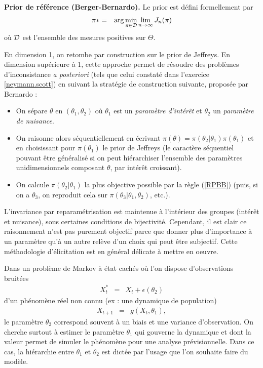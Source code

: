 \begin{definition}{\bf Prior de référence (Berger-Bernardo).}
Le prior est défini formellement par 
\begin{eqnarray}
\pi * & = & \arg\min\limits_{\pi\in{\cal{D}}} \lim\limits_{n\to \infty}J_n(\pi)\label{RPBB}
\end{eqnarray}
où ${\cal{D}}$ est l'ensemble des mesures positives sur $\Theta$. 
\end{definition}

En dimension 1, on retombe par construction sur le prior de Jeffreys. En dimension supérieure à 1, cette approche permet de résoudre des problèmes d'inconsistance {\it a posteriori} (tels que celui constaté dans l'exercice \ref{neymann.scott}) en suivant la stratégie de construction suivante, proposée par Bernardo :
\begin{itemize}
    \item On sépare $\theta$ en $(\theta_1,\theta_2)$ où $\theta_1$ est un \emph{paramètre d'intérêt} et $\theta_2$ un \emph{paramètre de nuisance}.
    \item On raisonne alors séquentiellement en écrivant $\pi(\theta)=\pi(\theta_2|\theta_1)\pi(\theta_1)$ et en choisissant pour $\pi(\theta_1)$ le prior de Jeffreys (le caractère séquentiel pouvant être généralisé si on peut hiérarchiser l'ensemble des paramètres unidimensionnels composant $\theta$, par intérêt croissant).
    \item On calcule $\pi(\theta_2|\theta_1)$ la plus objective possible par la règle (\ref{RPBB}) (puis, si on a $\theta_3$, on reproduit cela sur $\pi(\theta_3|\theta_1,\theta_2)$, etc.).
\end{itemize}
L'invariance par reparamétrisation est maintenue à l'intérieur des groupes (intér\^et et nuisance), sous certaines conditions de bijectivité. Cependant, il est clair ce raisonnement n’est pas purement objectif parce que donner plus d’importance à un paramètre qu’à un autre relève d’un choix qui peut être subjectif. Cette méthodologie d'élicitation est en général délicate à mettre en oeuvre. \\

\begin{exo}
Dans un problème de Markov à état cachés où l'on dispose d'observations bruitées
\begin{eqnarray*}
X^*_t & = & X_t + \epsilon(\theta_2) 
\end{eqnarray*}
d'un phénomène réel non connu (ex : une dynamique de population)
\begin{eqnarray*}
X_{t+1} & = & g(X_t,\theta_1),
\end{eqnarray*}
le paramètre  $\theta_2$ correspond souvent à un biais et une variance d'observation. On cherche surtout à estimer le paramètre $\theta_1$ qui gouverne la dynamique et dont la valeur permet de simuler le phénomène pour une analyse prévisionnelle. Dans ce cas, la hiérarchie entre $\theta_1$ et $\theta_2$ est dictée par l'usage que l'on souhaite faire du modèle.
\end{exo}


